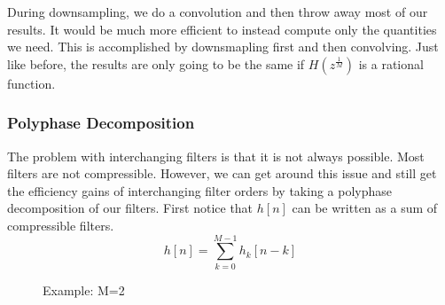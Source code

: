 \documentclass{article}
\begin{document}
During downsampling, we do a convolution and then throw away most of our results. It would be much more efficient to instead compute only the quantities we need.
This is accomplished by downsmapling first and then convolving. Just like before, the results are only going to be the same if $H(z^{\frac{1}{M}})$ is a rational function.
\subsubsection{Polyphase Decomposition}
The problem with interchanging filters is that it is not always possible. Most filters are not compressible. However, we can get around this issue
and still get the efficiency gains of interchanging filter orders by taking a polyphase decomposition of our filters. First notice that $h[n]$ can be written
as a sum of compressible filters.
$$h[n] = \sum_{k=0}^{M-1}h_k[n-k]$$
\begin{figure}[h!]
  \centering
  \caption{Example: M=2}
\end{figure}
\end{document}
